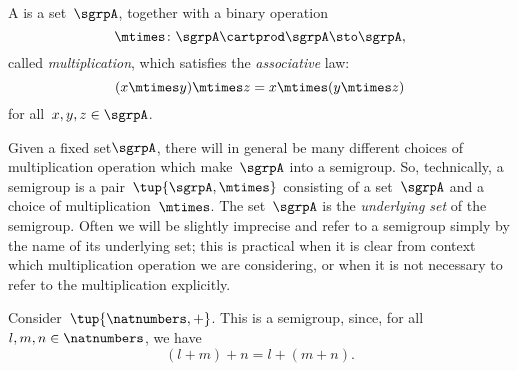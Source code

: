

\section{}\label{sec:semigroups}


\begin{definition}[Semigroup]
  \label{def:semigroup}
  A \emph{} is a set~$\sgrpA$, together with a binary operation~
  \begin{equation}
    \mtimes \colon \sgrpA \cartprod \sgrpA \sto \sgrpA,
  \end{equation}
  called \emph{multiplication}, which satisfies the \emph{associative} law:
  \begin{equation}
    \label{eq:semigroup-associative}
    (x\mtimes y) \mtimes z
    = x\mtimes (y\mtimes z)
  \end{equation}
  for all~$x , y, z \in \sgrpA$.
\end{definition}

\begin{remark}
  Given a fixed set$\sgrpA$, there will in general be many different choices of multiplication operation which make~$\sgrpA$ into a semigroup.
  So, technically, a semigroup is a pair~$\tup{\sgrpA, \mtimes}$ consisting of a set~$\sgrpA$ and a choice of multiplication~$\mtimes$.
  The set~$\sgrpA$ is the \emph{underlying set} of the semigroup.
  Often we will be slightly imprecise and refer to a semigroup simply by the name of its underlying set; this is practical when it is clear from context which multiplication operation we are considering, or when it is not necessary to refer to the multiplication explicitly.
\end{remark}

\begin{example}
  \label{natnum-semigroup}
  Consider~$\tup{\natnumbers,+}$. This is a semigroup, since, for all~$l,m, n \in \natnumbers$, we have
  \begin{equation*}
  (l+m)
    +n
    =l+(m+n).
  \end{equation*}
\end{example}

